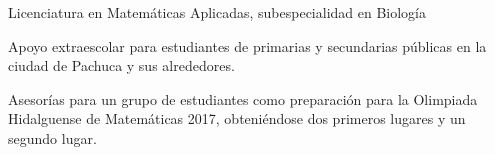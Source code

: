 \documentclass[a4paper,12pt]{memoir} %
\begin{document}
\userinformation %

\framebreak %







{Licenciatura en Matemáticas Aplicadas, subespecialidad en Biología}



\Sep %



{Apoyo extraescolar para estudiantes de primarias y secundarias públicas en la ciudad de Pachuca
y sus alrededores.}


{Asesorías para un grupo de estudiantes
como preparación para la Olimpiada Hidalguense de Matemáticas 2017, obteniéndose
dos primeros lugares y un segundo lugar.}


\end{document}
